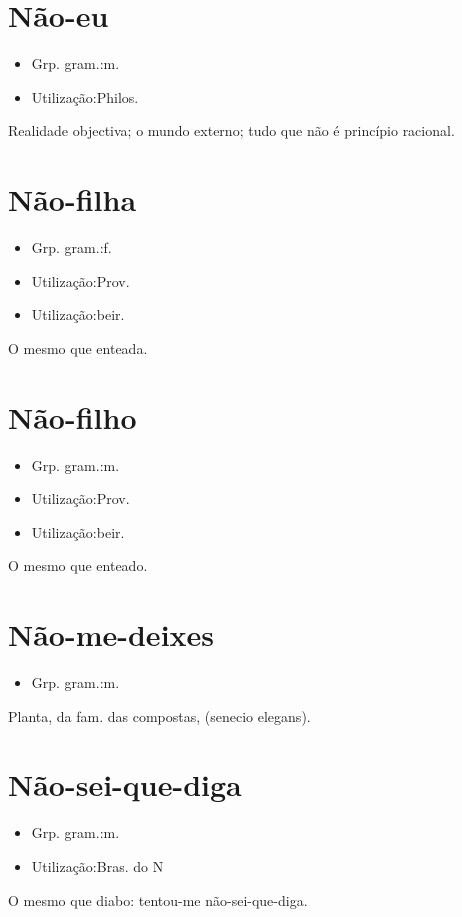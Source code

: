 \section{Não-eu}
\begin{itemize}
\item {Grp. gram.:m.}
\end{itemize}
\begin{itemize}
\item {Utilização:Philos.}
\end{itemize}
Realidade objectiva; o mundo externo; tudo que não é princípio racional.
\section{Não-filha}
\begin{itemize}
\item {Grp. gram.:f.}
\end{itemize}
\begin{itemize}
\item {Utilização:Prov.}
\end{itemize}
\begin{itemize}
\item {Utilização:beir.}
\end{itemize}
O mesmo que \textunderscore enteada\textunderscore .
\section{Não-filho}
\begin{itemize}
\item {Grp. gram.:m.}
\end{itemize}
\begin{itemize}
\item {Utilização:Prov.}
\end{itemize}
\begin{itemize}
\item {Utilização:beir.}
\end{itemize}
O mesmo que \textunderscore enteado\textunderscore .
\section{Não-me-deixes}
\begin{itemize}
\item {Grp. gram.:m.}
\end{itemize}
Planta, da fam. das compostas, (\textunderscore senecio elegans\textunderscore ).
\section{Não-sei-que-diga}
\begin{itemize}
\item {Grp. gram.:m.}
\end{itemize}
\begin{itemize}
\item {Utilização:Bras. do N}
\end{itemize}
O mesmo que \textunderscore diabo\textunderscore : \textunderscore tentou-me não-sei-que-diga\textunderscore .
